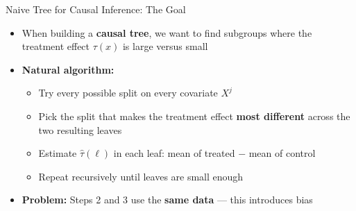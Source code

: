 \documentclass[hyperref={pdfpagelabels=false}]{beamer}
\begin{document}
\begin{frame}{Naive Tree for Causal Inference: The Goal}
	\begin{itemize}
		\item When building a \textbf{causal tree}, we want to find subgroups where the treatment effect $\tau(x)$ is large versus small
		\vspace{0.3cm}
		\item \textbf{Natural algorithm:}
		\vspace{0.2cm}
		\begin{itemize}
			\item[1.] Try every possible split on every covariate $X^j$
			\vspace{0.2cm}
			\item[2.] Pick the split that makes the treatment effect \textbf{most different} across the two resulting leaves
			\vspace{0.2cm}
			\item[3.] Estimate $\hat{\tau}(\ell)$ in each leaf: mean of treated $-$ mean of control
			\vspace{0.2cm}
			\item[4.] Repeat recursively until leaves are small enough
		\end{itemize}
		\vspace{0.3cm}
		\item \textbf{Problem:} Steps 2 and 3 use the \textbf{same data} --- this introduces bias
	\end{itemize}
\end{frame}
\end{document}
